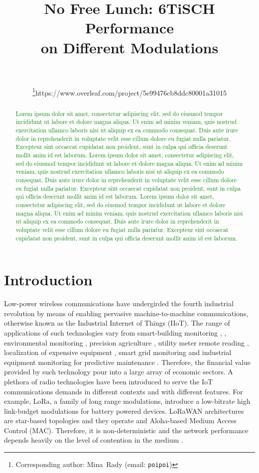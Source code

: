 \documentclass[journal]{IEEEtran}
\newcommand{\lorem}        {\textcolor{green}{Lorem ipsum dolor sit amet, consectetur adipiscing elit, sed do eiusmod tempor incididunt ut labore et dolore magna aliqua. Ut enim ad minim veniam, quis nostrud exercitation ullamco laboris nisi ut aliquip ex ea commodo consequat. Duis aute irure dolor in reprehenderit in voluptate velit esse cillum dolore eu fugiat nulla pariatur. Excepteur sint occaecat cupidatat non proident, sunt in culpa qui officia deserunt mollit anim id est laborum.}}
\begin{document}
\title{No Free Lunch: 6TiSCH Performance\\on Different Modulations}

\author{
    \\
    \\
    \thanks{Corresponding author: Mina~Rady (email: {\tt poipoi})}https://www.overleaf.com/project/5e99476cb8ddc80001a31015
}

\maketitle

\begin{abstract}
   \lorem
   \lorem
   \lorem
\end{abstract}

\tableofcontents

\section{Introduction}
\label{sec:introduction}


Low-power wireless communications have undergirded the fourth industrial revolution by means of enabling pervasive machine-to-machine communications, otherwise known as the Industrial Internet of Things (IIoT).
The range of applications of such technologies vary from smart-building monitoring \cite{munoz18overview}, \cite{kazmi14review}, environmental monitoring \cite{munoz18evaluationa}, precision agriculture \cite{watteyne16peach}, utility meter remote reading \cite{sum17experimental}, localization of expensive equipment \cite{tanakademo}, smart grid monitoring \cite{fadel15survey} and industrial equipment monitoring for predictive maintenance \cite{civerchia17industrial}.
Therefore, the financial value provided by such technology pour into a large array of economic sectors.
A plethora of radio technologies have been introduced to serve the IoT communications demands in different contexts and with different features.
For example, LoRa, a family of long range modulations, introduce a low-bitrate high link-budget modulations for battery powered devices.
LoRaWAN architectures are star-based topologies and they operate and Aloha-based Medium Access Control (MAC).
Therefore, it is non-deterministic and the network performance depends heavily on the level of contention in the medium \cite{adelantado17understandinga}.
\end{document}

